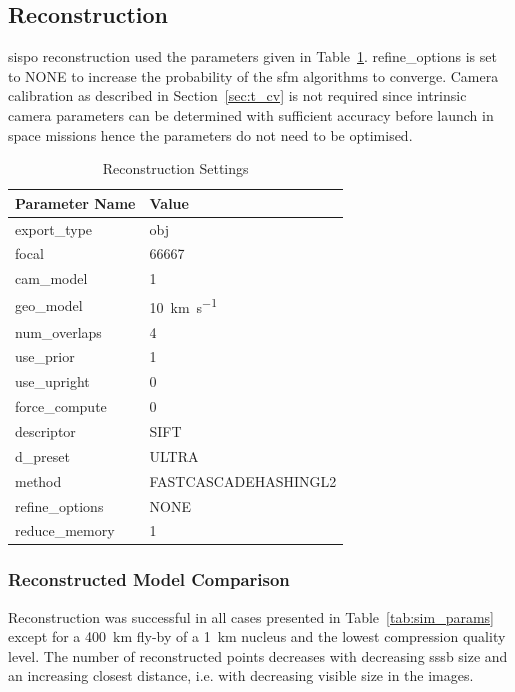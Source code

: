 \clearpage

\subsection{Reconstruction}
\gls{sispo} reconstruction used the parameters given in Table~\ref{tab:comp_settings}. refine\_options is set to NONE to increase the probability of the \gls{sfm} algorithms to converge. Camera calibration as described in Section~\ref{sec:t_cv} is not required since intrinsic camera parameters can be determined with sufficient accuracy before launch in space missions hence the parameters do not need to be optimised.

\begin{table}[htb]
    \centering
    \caption{Reconstruction Settings}
    \label{tab:comp_settings}
    \begin{tabular}{l|l}
        \textbf{Parameter Name} & \textbf{Value} \\ \hline
        export\_type       & obj   \\
        focal & 66667 \\
        cam\_model & \SI{1}{}     \\
        geo\_model & \SI{10}{\kilo\meter\per\second} \\
        num\_overlaps  & \SI{4}{} \\
        use\_prior & \SI{1}{} \\
        use\_upright & \SI{0}{} \\
        force\_compute & \SI{0}{} \\
        descriptor & SIFT \\
        d\_preset & ULTRA \\
        method & FASTCASCADEHASHINGL2 \\
        refine\_options & NONE \\
        reduce\_memory & 1
    \end{tabular}
\end{table}

\subsubsection{Reconstructed Model Comparison}
Reconstruction was successful in all cases presented in Table~\ref{tab:sim_params} except for a \SI{400}{\kilo\meter} fly-by of a \SI{1}{\kilo\meter} nucleus and the lowest compression quality level. The number of reconstructed points decreases with decreasing \gls{sssb} size and an increasing closest distance, i.e. with decreasing visible size in the images.

